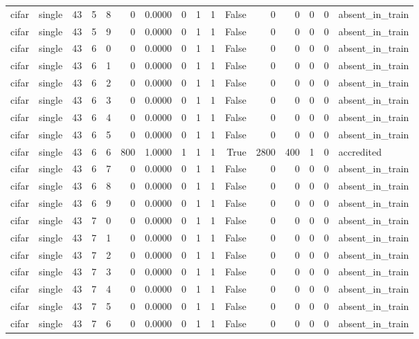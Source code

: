 \begin{tabular}{llrrrrrrrrrrrrrl}
cifar & single & 43 & 5 & 8 & 0 & 0.0000 & 0 & 1 & 1 & False & 0 & 0 & 0 & 0 & absent\_in\_train \\
cifar & single & 43 & 5 & 9 & 0 & 0.0000 & 0 & 1 & 1 & False & 0 & 0 & 0 & 0 & absent\_in\_train \\
cifar & single & 43 & 6 & 0 & 0 & 0.0000 & 0 & 1 & 1 & False & 0 & 0 & 0 & 0 & absent\_in\_train \\
cifar & single & 43 & 6 & 1 & 0 & 0.0000 & 0 & 1 & 1 & False & 0 & 0 & 0 & 0 & absent\_in\_train \\
cifar & single & 43 & 6 & 2 & 0 & 0.0000 & 0 & 1 & 1 & False & 0 & 0 & 0 & 0 & absent\_in\_train \\
cifar & single & 43 & 6 & 3 & 0 & 0.0000 & 0 & 1 & 1 & False & 0 & 0 & 0 & 0 & absent\_in\_train \\
cifar & single & 43 & 6 & 4 & 0 & 0.0000 & 0 & 1 & 1 & False & 0 & 0 & 0 & 0 & absent\_in\_train \\
cifar & single & 43 & 6 & 5 & 0 & 0.0000 & 0 & 1 & 1 & False & 0 & 0 & 0 & 0 & absent\_in\_train \\
cifar & single & 43 & 6 & 6 & 800 & 1.0000 & 1 & 1 & 1 & True & 2800 & 400 & 1 & 0 & accredited \\
cifar & single & 43 & 6 & 7 & 0 & 0.0000 & 0 & 1 & 1 & False & 0 & 0 & 0 & 0 & absent\_in\_train \\
cifar & single & 43 & 6 & 8 & 0 & 0.0000 & 0 & 1 & 1 & False & 0 & 0 & 0 & 0 & absent\_in\_train \\
cifar & single & 43 & 6 & 9 & 0 & 0.0000 & 0 & 1 & 1 & False & 0 & 0 & 0 & 0 & absent\_in\_train \\
cifar & single & 43 & 7 & 0 & 0 & 0.0000 & 0 & 1 & 1 & False & 0 & 0 & 0 & 0 & absent\_in\_train \\
cifar & single & 43 & 7 & 1 & 0 & 0.0000 & 0 & 1 & 1 & False & 0 & 0 & 0 & 0 & absent\_in\_train \\
cifar & single & 43 & 7 & 2 & 0 & 0.0000 & 0 & 1 & 1 & False & 0 & 0 & 0 & 0 & absent\_in\_train \\
cifar & single & 43 & 7 & 3 & 0 & 0.0000 & 0 & 1 & 1 & False & 0 & 0 & 0 & 0 & absent\_in\_train \\
cifar & single & 43 & 7 & 4 & 0 & 0.0000 & 0 & 1 & 1 & False & 0 & 0 & 0 & 0 & absent\_in\_train \\
cifar & single & 43 & 7 & 5 & 0 & 0.0000 & 0 & 1 & 1 & False & 0 & 0 & 0 & 0 & absent\_in\_train \\
cifar & single & 43 & 7 & 6 & 0 & 0.0000 & 0 & 1 & 1 & False & 0 & 0 & 0 & 0 & absent\_in\_train \\

\end{tabular}
